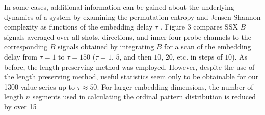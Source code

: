 \documentclass[aps,twocolumn,secnumarabic,nobalancelastpage,amsmath,amssymb,
nofootinbib]{revtex4-1}
\begin{document}
In some cases, additional information can be gained about the underlying dynamics of a system by examining the permutation entropy and Jensen-Shannon complexity as functions of the embedding delay $\tau$ \cite{zunino2012}. Figure 3 compares SSX $\dot{B}$ signals averaged over all shots, directions, and inner four probe channels to the corresponding $B$ signals obtained by integrating $\dot{B}$ for a scan of the embedding delay from $\tau=1$ to $\tau=150$ ($\tau=1$, $5$, and then $10$, $20$, etc. in steps of $10$). As before, the length-preserving method was employed. However, despite the use of the length preserving method, useful statistics seem only to be obtainable for our 1300 value series up to $\tau \approx 50$. For larger embedding dimensions, the number of length $n$ segments used in calculating the ordinal pattern distribution is reduced by over 15%
\end{document}
